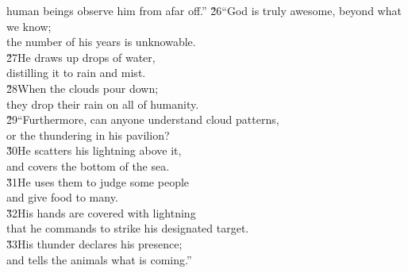 \begin{poetry}
\poemll    human beings observe him from afar off.''
\poeml \v{26}``God is truly awesome, beyond what we know; \\
\poemll    the number of his years is unknowable. \\
\poeml \v{27}He draws up drops of water, \\
\poemll    distilling it to rain and mist. \\
\poeml \v{28}When the clouds pour down; \\
\poemll    they drop their rain on all of humanity. \\
\poeml \v{29}``Furthermore, can anyone understand cloud patterns, \\
\poemll    or the thundering in his pavilion? \\
\poeml \v{30}He scatters his lightning above it, \\
\poemll    and covers the bottom of the sea. \\
\poeml \v{31}He uses them to judge some people \\
\poemll    and give food to many. \\
\poeml \v{32}His hands are covered with lightning \\
\poemll    that he commands to strike his designated target. \\
\poeml \v{33}His thunder declares his presence; \\
\poemll    and tells the animals what is coming.''
\end{poetry}


